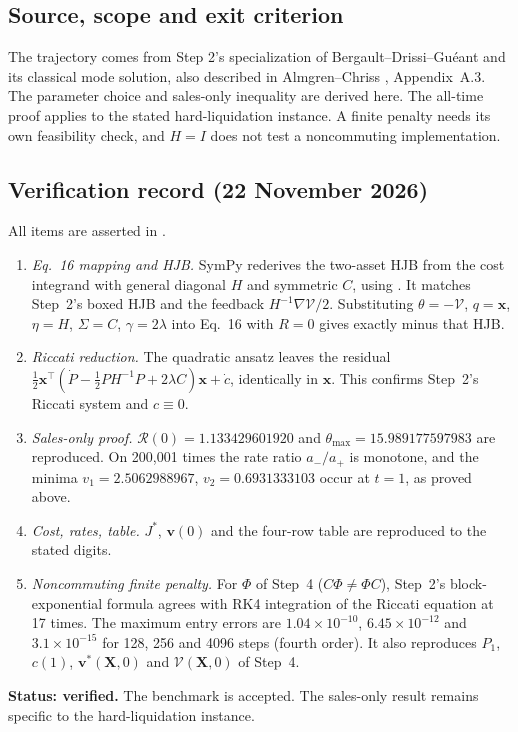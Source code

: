 \subsection*{Source, scope and exit criterion}

The trajectory comes from Step 2's specialization of
Bergault--Drissi--Gu\'eant \cite{bergault2022} and its classical
mode solution, also described in Almgren--Chriss
\cite{almgrenchriss2000}, Appendix~A.3. The parameter choice and sales-only
inequality are derived here. The all-time proof applies to the stated
hard-liquidation instance. A finite penalty needs its own feasibility check,
and $H=I$ does not test a noncommuting implementation.

\subsection*{Verification record (22 November 2026)}

All items are asserted in .
\begin{enumerate}
\item \emph{Eq.~16 mapping and HJB.} SymPy rederives the two-asset HJB
from the cost integrand with general diagonal $H$ and symmetric $C$, using
. It matches Step~2's boxed HJB and the
feedback $H^{-1}\nabla\mathcal V/2$. Substituting $\theta=-\mathcal V$,
$q=\mathbf x$, $\eta=H$, $\Sigma=C$, $\gamma=2\lambda$ into Eq.~16 with
$R=0$ gives exactly minus that HJB.
\item \emph{Riccati reduction.} The quadratic ansatz leaves the residual
$\tfrac12\mathbf x^\top(\dot P-\tfrac12PH^{-1}P+2\lambda C)\mathbf x+\dot c$,
identically in $\mathbf x$. This confirms Step~2's Riccati system and $c\equiv0$.
\item \emph{Sales-only proof.} $\mathcal R(0)=1.133429601920$ and
$\theta_{\max}=15.989177597983$ are reproduced. On 200{,}001 times the rate
ratio $a_-/a_+$ is monotone, and the minima
$v_1=2.5062988967$, $v_2=0.6931333103$ occur at $t=1$, as proved above.
\item \emph{Cost, rates, table.} $J^*$, $\mathbf v(0)$ and the four-row
table are reproduced to the stated digits.
\item \emph{Noncommuting finite penalty.} For $\Phi$ of Step~4
($C\Phi\ne\Phi C$), Step~2's block-exponential formula agrees with RK4 integration of the Riccati
equation at 17 times. The maximum entry errors are
$1.04\times10^{-10}$, $6.45\times10^{-12}$ and $3.1\times10^{-15}$ for 128,
256 and 4096 steps (fourth order). It also reproduces $P_1$, $c(1)$,
$\mathbf v^*(\mathbf X,0)$ and $\mathcal V(\mathbf X,0)$ of Step~4.
\end{enumerate}
\textbf{Status: verified.} The benchmark is accepted. The sales-only result
remains specific to the hard-liquidation instance.

